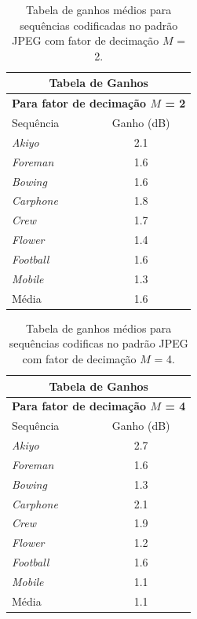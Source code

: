 \begin{table}[hbt]
\centering
\caption{Tabela de ganhos médios para sequências codificadas no padrão JPEG com fator de decimação $M$ = 2.}
\label{GanhoJpeg2}
\begin{tabular}{|l|c|}
\hline
\multicolumn{2}{|c|}{\textbf{Tabela de Ganhos}}\\
\hline
\hline
\multicolumn{2}{|c|}{\textbf{Para fator de decimação $M$ = 2}}\\
\hline
\hline			
Sequência	    & Ganho (dB)\\
\hline
\hline
\textit{Akiyo}		&2.1\\
\hline
\textit{Foreman}		&1.6\\
\hline
\textit{Bowing}		&1.6\\
\hline
\textit{Carphone}		&1.8\\
\hline
\textit{Crew}		&1.7\\
\hline
\textit{Flower}		&1.4\\
\hline
\textit{Football}		&1.6\\
\hline
\textit{Mobile}	&1.3\\
\hline
\hline
Média		&1.6\\
\hline
\end{tabular}

\end{table}

\begin{table}[hbt]
\centering
\caption{Tabela de ganhos médios para sequências codificas no padrão JPEG com fator de decimação $M$ = 4.}	
\label{GanhoJpeg4}
\begin{tabular}{|l|c|}
\hline
\multicolumn{2}{|c|}{\textbf{Tabela de Ganhos}}\\
\hline
\hline
\multicolumn{2}{|c|}{\textbf{Para fator de decimação $M$ = 4}}\\
\hline
\hline			
Sequência	    & Ganho (dB)\\
\hline
\hline
\textit{Akiyo}		&2.7\\
\hline
\textit{Foreman}		&1.6 \\
\hline
\textit{Bowing}		&1.3\\
\hline
\textit{Carphone}	& 2.1\\
\hline
\textit{Crew}		& 1.9\\
\hline
\textit{Flower}		&1.2\\
\hline
\textit{Football}		&1.6\\
\hline
\textit{Mobile}	&1.1\\
\hline
\hline
Média	&1.1\\
\hline
\end{tabular}
\end{table}
